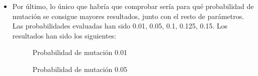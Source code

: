 \documentclass[a4,11pt]{article}
\begin{document}
\begin{itemize}
\begin{figure}[t!]
\begin{center}
\end{center}
\caption{Probabilidad de cruce 0.85}
\label{fig:cruce085}
\end{figure}

\begin{figure}[t!]
\begin{center}
\end{center}
\caption{Probabilidad de cruce 0.8}
\label{fig:cruce08}
\end{figure}

\begin{figure}[t!]
\begin{center}
\end{center}
\caption{Probabilidad de cruce 0.9}
\label{fig:cruce09}
\end{figure}

\begin{figure}[t!]
\begin{center}
\end{center}
\caption{Probabilidad de cruce 0.95}
\label{fig:cruce095}
\end{figure}

Como puede verse, la probabilidad de cruce que mayor número de soluciones proporciona es 0.85 (\ref{fig:cruce085}), seguida de 0.8 (\ref{fig:cruce08}).

\item Por último, lo único que habría que comprobar sería para qué probabilidad de mutación se consigue mayores resultados, junto con el resto de parámetros. Las probabilidades evaluadas han sido 0.01, 0.05, 0.1, 0.125, 0.15. Los resultados han sido los siguientes:

\begin{figure}[h]
\begin{center}
\end{center}
\caption{Probabilidad de mutación 0.01}
\label{fig:muta001}
\end{figure}

\begin{figure}[h]
\begin{center}
\end{center}
\caption{Probabilidad de mutación 0.05}
\label{fig:muta005}
\end{figure}


\end{itemize}
\end{document}
